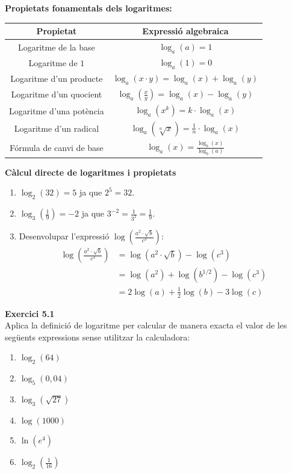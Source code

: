 \documentclass[12pt]{article}
\begin{document}
\begin{concept}
\textbf{Propietats fonamentals dels logaritmes:}
\begin{table}[H]
\centering
\small
\begin{tabular}{|c|c|}
\hline
\textbf{Propietat} & \textbf{Expressió algebraica} \\ \hline
Logaritme de la base & $\log_a(a) = 1$ \\ \hline
Logaritme de $1$ & $\log_a(1) = 0$ \\ \hline
Logaritme d'un producte & $\log_a(x \cdot y) = \log_a(x) + \log_a(y)$ \\ \hline
Logaritme d'un quocient & $\log_a\left(\frac{x}{y}\right) = \log_a(x) - \log_a(y)$ \\ \hline
Logaritme d'una potència & $\log_a(x^k) = k \cdot \log_a(x)$ \\ \hline
Logaritme d'un radical & $\log_a(\sqrt[n]{x}) = \frac{1}{n} \cdot \log_a(x)$ \\ \hline
Fórmula de canvi de base & $\log_a(x) = \frac{\log_b(x)}{\log_b(a)}$ \\ \hline
\end{tabular}
\end{table}
\end{concept}

\begin{exemple}
\textbf{Càlcul directe de logaritmes i propietats}
\begin{enumerate}[label=\alph*)]
    \item $\log_2(32) = 5$ ja que $2^5 = 32$.
    \item $\log_3\left(\frac{1}{9}\right) = -2$ ja que $3^{-2} = \frac{1}{3^2} = \frac{1}{9}$.
    \item Desenvolupar l'expressió $\log\left(\frac{a^2 \cdot \sqrt{b}}{c^3}\right)$:
    \begin{align*}
        \log\left(\frac{a^2 \cdot \sqrt{b}}{c^3}\right) &= \log(a^2 \cdot \sqrt{b}) - \log(c^3) \\
        &= \log(a^2) + \log(b^{1/2}) - \log(c^3) \\
        &= 2\log(a) + \frac{1}{2}\log(b) - 3\log(c)
    \end{align*}
\end{enumerate}
\end{exemple}

\begin{exercici}
\textbf{Exercici 5.1}\\
Aplica la definició de logaritme per calcular de manera exacta el valor de les següents expressions sense utilitzar la calculadora:
\begin{enumerate}[label=\alph*)]
    \item $\log_2(64)$
    \item $\log_5(0{,}04)$
    \item $\log_3(\sqrt{27})$
    \item $\log\left(1000\right)$
    \item $\ln(e^4)$
    \item $\log_2\left(\frac{1}{16}\right)$
\end{enumerate}
\end{exercici}
\end{document}
